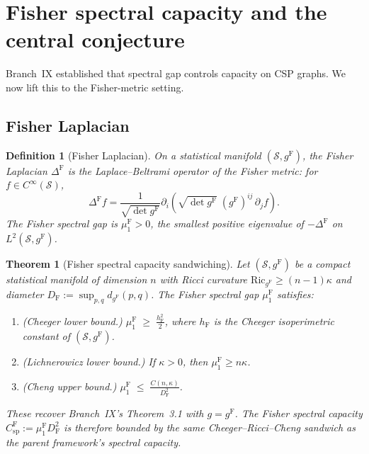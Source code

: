 \documentclass[11pt]{article}
\newcommand{\gF}{g^{\mathrm{F}}}
\newtheorem{definition}{Definition}
\newtheorem{theorem}{Theorem}
\theoremstyle{remark}
\begin{document}
\section{Fisher spectral capacity and the central conjecture}
\label{sec:spectral-capacity}

Branch~IX established that spectral gap controls capacity on CSP graphs.
We now lift this to the Fisher-metric setting.

\subsection{Fisher Laplacian}

\begin{definition}[Fisher Laplacian]\label{def:fisher-laplacian}
On a statistical manifold $(\mathcal{S}, \gF)$, the \emph{Fisher Laplacian}
$\Delta^{\mathrm{F}}$ is the Laplace--Beltrami operator of the Fisher metric:
for $f \in C^\infty(\mathcal{S})$,
\begin{equation}\label{eq:fisher-laplacian}
\Delta^{\mathrm{F}} f
= \frac{1}{\sqrt{\det \gF}}
\partial_i\!\left(\sqrt{\det \gF}\; (\gF)^{ij}\, \partial_j f\right).
\end{equation}
The \emph{Fisher spectral gap} is $\mu_1^{\mathrm{F}} > 0$, the smallest
positive eigenvalue of $-\Delta^{\mathrm{F}}$ on $L^2(\mathcal{S}, \gF)$.
\end{definition}

\begin{theorem}[Fisher spectral capacity sandwiching]
\label{thm:fisher-spectral-sandwich}
Let $(\mathcal{S}, \gF)$ be a compact statistical manifold of dimension $n$
with Ricci curvature $\mathrm{Ric}_{\gF} \ge (n-1)\kappa$ and diameter
$D_{\mathrm{F}} := \sup_{p,q} d_{\gF}(p,q)$.  The Fisher spectral gap
$\mu_1^{\mathrm{F}}$ satisfies:
\begin{enumerate}[label=\textnormal{(\roman*)}, leftmargin=*]
  \item \emph{(Cheeger lower bound.)}
  $\displaystyle \mu_1^{\mathrm{F}} \;\ge\; \frac{h_{\mathrm{F}}^2}{2}$,
  where $h_{\mathrm{F}}$ is the Cheeger isoperimetric constant of
  $(\mathcal{S}, \gF)$.
  \item \emph{(Lichnerowicz lower bound.)} If $\kappa > 0$, then
  $\mu_1^{\mathrm{F}} \ge n\kappa$.
  \item \emph{(Cheng upper bound.)}
  $\displaystyle \mu_1^{\mathrm{F}} \;\le\;
  \frac{C(n, \kappa)}{D_{\mathrm{F}}^2}$.
\end{enumerate}
These recover Branch~IX's Theorem~3.1 with $g = \gF$.  The Fisher spectral
capacity $C_{\mathrm{sp}}^{\mathrm{F}} := \mu_1^{\mathrm{F}} D_{\mathrm{F}}^2$
is therefore bounded by the same Cheeger--Ricci--Cheng sandwich as the parent
framework's spectral capacity.
\end{theorem}
\end{document}
